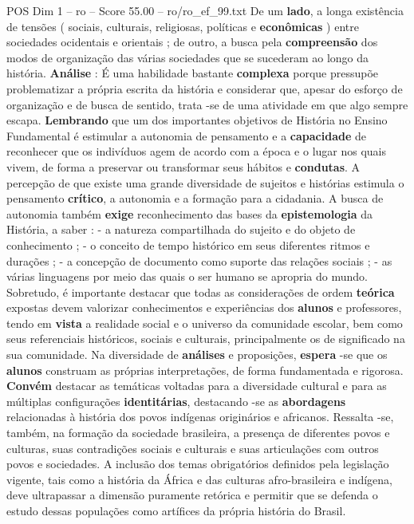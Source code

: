 \begin{textsample}{POS Dim 1 – ro – Score 55.00 – ro/ro\_ef\_99.txt}
De um \textbf{lado}, a longa existência de tensões ( sociais, culturais, religiosas, políticas e \textbf{econômicas} ) entre sociedades ocidentais e orientais ; de outro, a busca pela \textbf{compreensão} dos modos de organização das várias sociedades que se sucederam ao longo da história. \textbf{Análise} : É uma habilidade bastante \textbf{complexa} porque pressupõe problematizar a própria escrita da história e considerar que, apesar do esforço de organização e de busca de sentido, trata -se de uma atividade em que algo sempre escapa. \textbf{Lembrando} que um dos importantes objetivos de História no Ensino Fundamental é estimular a autonomia de pensamento e a \textbf{capacidade} de reconhecer que os indivíduos agem de acordo com a época e o lugar nos quais vivem, de forma a preservar ou transformar seus hábitos e \textbf{condutas}.
A percepção de que existe uma grande diversidade de sujeitos e histórias estimula o pensamento \textbf{crítico}, a autonomia e a formação para a cidadania.
A busca de autonomia também \textbf{exige} reconhecimento das bases da \textbf{epistemologia} da História, a saber : - a natureza compartilhada do sujeito e do objeto de conhecimento ; - o conceito de tempo histórico em seus diferentes ritmos e durações ; - a concepção de documento como suporte das relações sociais ; - as várias linguagens por meio das quais o ser humano se apropria do mundo.
Sobretudo, é importante destacar que todas as considerações de ordem \textbf{teórica} expostas devem valorizar conhecimentos e experiências dos \textbf{alunos} e professores, tendo em \textbf{vista} a realidade social e o universo da comunidade escolar, bem como seus referenciais históricos, sociais e culturais, principalmente os de significado na sua comunidade.
Na diversidade de \textbf{análises} e proposições, \textbf{espera} -se que os \textbf{alunos} construam as próprias interpretações, de forma fundamentada e rigorosa. \textbf{Convém} destacar as temáticas voltadas para a diversidade cultural e para as múltiplas configurações \textbf{identitárias}, destacando -se as \textbf{abordagens} relacionadas à história dos povos indígenas originários e africanos.
Ressalta -se, também, na formação da sociedade brasileira, a presença de diferentes povos e culturas, suas contradições sociais e culturais e suas articulações com outros povos e sociedades.
A inclusão dos temas obrigatórios definidos pela legislação vigente, tais como a história da África e das culturas afro-brasileira e indígena, deve ultrapassar a dimensão puramente retórica e permitir que se defenda o estudo dessas populações como artífices da própria história do Brasil.

\end{textsample}
